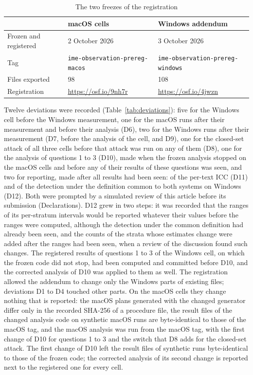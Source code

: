 \begin{table}[t]
\caption{The two freezes of the registration}
\label{tab:freezes}
\begin{tabular}{L{0.20}L{0.40}L{0.40}}
\toprule
& macOS cells & Windows addendum \\
\midrule
Frozen and registered & 2 October 2026 & 3 October 2026 \\
Tag & \texttt{ime-observation-prereg-macos} & \texttt{ime-observation-prereg-windows} \\
Files exported & 98 & 108 \\
Registration & \url{https://osf.io/9nh7r} & \url{https://osf.io/4jwzn} \\
\bottomrule
\end{tabular}
\end{table}

Twelve deviations were recorded (Table~\ref{tab:deviations}): five for the Windows cell before the Windows
measurement, one for the macOS runs after their measurement and before their analysis (D6), two for the Windows runs
after their measurement (D7, before the analysis of the cell, and D9), one for the closed-set attack of all three
cells before that attack was run on any of them (D8), one for the analysis of questions 1 to 3 (D10), made when the
frozen analysis stopped on the macOS cells and before any of their results of these questions was seen, and two for
reporting, made after all results had been seen: of the per-text ICC (D11) and of the detection under the definition
common to both systems on Windows (D12). Both were prompted by a simulated review of this article before its submission
(Declarations). D12 grew in two steps: it was recorded that the ranges of its per-stratum intervals would be reported
whatever their values before the ranges were computed, although the detection under the common definition had already
been seen, and the counts of the strata whose estimates change were added after the ranges had been seen, when a review
of the discussion found such changes. The registered results of questions 1 to 3
of the Windows cell, on which the frozen code did not stop, had been computed and committed before D10, and the
corrected analysis of D10 was applied to them as well. The
registration allowed the addendum to change only the Windows parts of existing files; deviations D1 to D4 touched
other parts. On the macOS cells they change nothing that is reported: the macOS plans generated with the changed
generator differ only in the recorded SHA-256 of a procedure file, the result files of the changed analysis code on
synthetic macOS runs are byte-identical to those of the macOS tag, and the macOS analysis was run from the macOS tag,
with the first change of D10 for questions 1 to 3 and the switch that D8 adds for the closed-set attack. The first
change of D10 left the result files of synthetic runs byte-identical to those of the frozen code; the corrected
analysis of its second change is reported next to the registered one for every cell.

